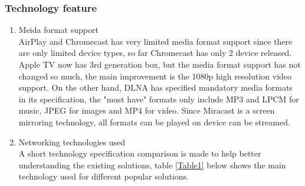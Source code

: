 \subsubsection{Technology feature} 
\begin{enumerate} 
\item Meida format support \\ 
AirPlay and Chromecast has very limited media format support since there are 
only limited device types, so far Chromecast has only 2 device released. Apple 
TV now has 3rd generation box, but the media format support has not changed so 
much, the main improvement is the 1080p high resolution video support. On the 
other hand, DLNA has specified mandatory media formats in its specification, 
the "must have" formats only include MP3 and LPCM for music, JPEG for images and MP4 for video. 
Since Miracast is a screen mirroring technology, all formats can be played on device can be streamed. 

\item Networking technologies used \\ 

A short technology specification comparison is made to help better understanding 
the existing solutions, table \ref{Table1} below shows the main technology used 
for different popular solutions. 
\begin{table}[htb] 
\caption{Technology used comparison\label{Table1}} 
\begin{center} 
\end{center} 
\end{table} 


\end{enumerate}
